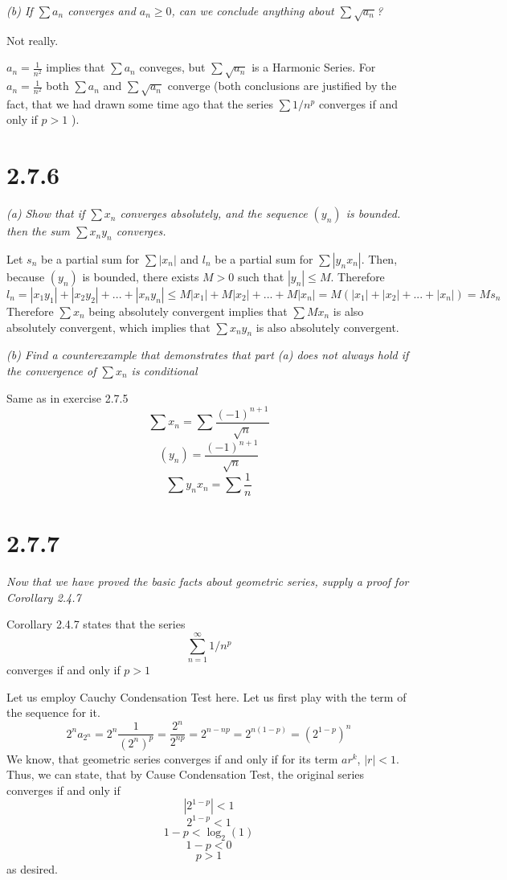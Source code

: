\documentclass[11pt,oneside,titlepage]{article}
\begin{document}
\textit{(b) If $\sum a_n$ converges and $a_n \geq 0$, can we conclude anything
  about $\sum \sqrt{a_n}$?}

Not really.

$a_n = \frac{1}{n^2}$ implies that  $\sum a_n $ conveges, but $\sum \sqrt{a_n}$
is a Harmonic Series. For $a_n = \frac{1}{n^2}$ both $\sum a_n$ and
$\sum \sqrt{a_n}$ converge (both conclusions are justified by the fact, that
we had drawn  some time ago that the series
$\sum 1/n^p$ converges if and only if $p > 1$ ).

\section*{2.7.6}
\textit{(a) Show that if $\sum x_n$ converges absolutely, and the sequence
$(y_n)$ is bounded. then the sum $\sum x_n y_n$ converges.}


Let $s_n$ be a partial sum for $\sum |x_n|$ and $l_n$ be a partial sum
for $\sum |y_n x_n|$. Then, because $(y_n)$
is bounded, there exists $M > 0$ such that $|y_n| \leq M$.  Therefore
$$l_n = |x_1 y_1| + |x_2 y_2| + ... + |x_n y_n| \leq M|x_1| + M|x_2| + ... +
M|x_n| = M(|x_1| + |x_2| + ... + |x_n|) = Ms_n$$
Therefore $\sum x_n$  being absolutely  convergent implies that
$\sum M x_n$ is also absolutely convergent, which implies that $\sum x_n y_n$
is also absolutely convergent.

\textit{(b) Find a counterexample that demonstrates that part (a) does not
  always hold if the convergence of $\sum x_n$ is conditional}

Same as in exercise 2.7.5
$$\sum x_n = \sum \frac{(-1)^{n + 1}}{\sqrt{n}}$$
$$(y_n) = \frac{(-1)^{n + 1}}{\sqrt{n}}$$
$$\sum y_n x_n = \sum \frac{1}{n}$$

\section*{2.7.7}
\textit{Now that we have proved the basic facts about geometric series,
  supply a proof for Corollary 2.4.7}

Corollary 2.4.7 states that the series
$$\sum^{\infty}_{n = 1} 1/n^p$$
converges if and only if $p > 1$



Let us employ Cauchy Condensation Test here.
Let us first play with the term of the sequence for it.
$$2^n a_{2^n} = 2^n \frac{1}{(2^n)^p} = \frac{2^n}{2^{np}} =
2^{n - np} = 2^{n(1 - p)} = (2^{1 - p})^n$$
We know, that geometric series converges if and only if
for its term $ar^k$,  $|r| < 1$. Thus, we
can state, that by Cause Condensation Test, the original series converges
if and only if 
$$|2^{1 - p}| < 1$$
$$2^{1 - p} < 1$$
$$1 - p < \log_2 (1)$$
$$1 - p < 0$$
$$p > 1$$
as desired.
\end{document}
